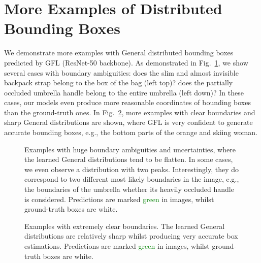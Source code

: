 \documentclass{article}
\begin{document}
\section{More Examples of Distributed Bounding Boxes}
We demonstrate more examples with General distributed bounding boxes predicted by GFL (ResNet-50 backbone). As demonstrated in Fig.~\ref{fig_more_bad_cropped}, we show several cases with boundary ambiguities: does the slim and almost invisible backpack strap belong to the box of the bag (left top)? does the partially occluded umbrella handle belong to the entire umbrella (left down)? In these cases, our models even produce more reasonable coordinates of bounding boxes than the ground-truth ones. In Fig.~\ref{fig_more_good_cropped}, more examples with clear boundaries and sharp General distributions are shown, where GFL is very confident to generate accurate bounding boxes, e.g., the bottom parts of the orange and skiing woman.


\begin{figure}[h]
	\begin{center}
		\setlength{\fboxrule}{0pt}
	\end{center}	
	\vspace{-12pt}
	\caption{Examples with huge boundary ambiguities and uncertainties, where the learned General distributions tend to be flatten. In some cases, we even observe a distribution with two peaks. Interestingly, they do correspond to two different most likely boundaries in the image, e.g., the boundaries of the umbrella whether its heavily occluded  handle is considered. Predictions are marked \textcolor{green}{green} in images, whilst ground-truth boxes are white.}
	\label{fig_more_bad_cropped}
	\vspace{-10pt}
\end{figure}
\begin{figure}[h]
	\begin{center}
		\setlength{\fboxrule}{0pt}
	\end{center}	
	\vspace{-12pt}
	\caption{Examples with extremely clear boundaries. The learned General distributions are relatively sharp whilst producing very accurate box estimations. Predictions are marked \textcolor{green}{green} in images, whilst ground-truth boxes are white.}
	\label{fig_more_good_cropped}
	\vspace{-10pt}
\end{figure}
\end{document}
